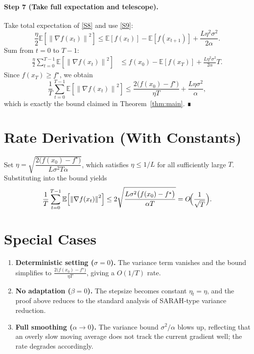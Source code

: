 \documentclass{article}
\newcommand{\E}{\mathbb{E}}
\newcommand{\norm}[1]{\left\|#1\right\|}
\newcommand{\grad}{\nabla}
\begin{document}
\paragraph{Step 7 (Take full expectation and telescope).}
Take total expectation of \eqref{S8} and use \eqref{S9}:
\[
    \frac{\eta}{2}\E\!\left[\norm{\grad f(x_t)}^2\right]
    \le \E\!\left[f(x_t)\right]-\E\!\left[f(x_{t+1})\right]
        +\frac{L\eta^2\sigma^2}{2\alpha}.
\]
Sum from $t=0$ to $T-1$:
\begin{align}
    \frac{\eta}{2}\sum_{t=0}^{T-1}\E\!\left[\norm{\grad f(x_t)}^2\right]
    &\le f(x_0)-\E\!\left[f(x_T)\right]
        +\frac{L\eta^2\sigma^2}{2\alpha}T .\tag{S10}
\end{align}
Since $f(x_T)\ge f^\star$, we obtain
\[
    \frac{1}{T}\sum_{t=0}^{T-1}\E\!\left[\norm{\grad f(x_t)}^2\right]
    \le \frac{2\bigl(f(x_0)-f^\star\bigr)}{\eta T}
        +\frac{L\eta\sigma^2}{\alpha},
\]
which is exactly the bound claimed in Theorem~\ref{thm:main}. ∎

\section*{Rate Derivation (With Constants)}
Set $\eta = \sqrt{\dfrac{2\bigl(f(x_0)-f^\star\bigr)}{L\sigma^2T\alpha}}$, which satisfies $\eta\le 1/L$ for all sufficiently large $T$. Substituting into the bound yields
\[
    \frac{1}{T}\sum_{t=0}^{T-1}\E\!\left[\norm{\grad f(x_t)}^2\right]
    \le 2\sqrt{\frac{L\sigma^2\bigl(f(x_0)-f^\star\bigr)}{\alpha T}}
    = O\!\Bigl(\frac{1}{\sqrt{T}}\Bigr).
\]

\section*{Special Cases}
\begin{enumerate}
    \item \textbf{Deterministic setting ($\sigma=0$).} The variance term vanishes and the bound simplifies to
    $\frac{2\bigl(f(x_0)-f^\star\bigr)}{\eta T}$, giving a $O(1/T)$ rate.
    \item \textbf{No adaptation ($\beta=0$).} The stepsize becomes constant $\eta_t=\eta$, and the proof above reduces to the standard analysis of SARAH‑type variance reduction.
    \item \textbf{Full smoothing ($\alpha\to 0$).} The variance bound $\sigma^2/\alpha$ blows up, reflecting that an overly slow moving average does not track the current gradient well; the rate degrades accordingly.
\end{enumerate}
\end{document}
